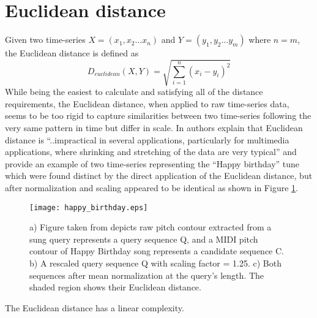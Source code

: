\section{Euclidean distance} \label{euclidean_distance}
Given two time-series $X=(x_{1},x_{2}...x_{n})$ and $Y=(y_{1},y_{2}...y_{m})$ where $n=m$, the Euclidean distance is defined as
\begin{equation}
 D_{euclidean}(X,Y) = \sqrt{ \sum_{i=1}^{n}  (x_{i} - y_{i})^2 }
 \label{eq:euclidean_distance}
\end{equation}
While being the easiest to calculate and satisfying all of the distance requirements, the Euclidean distance, when applied to raw time-series data, seems to be too rigid to capture similarities between two time-series following the very same pattern in time but differ in scale. In \cite{citeulike:4107287} authors explain that Euclidean distance is ``..impractical in several applications, particularly for multimedia applications, where shrinking and stretching of the data are very typical'' and provide an example of two time-series representing the ``Happy birthday'' tune which were found distinct by the direct application of the Euclidean distance, but after normalization and scaling appeared to be identical as shown in Figure \ref{fig:happybirthday}.
\begin{figure}[tbp]
   \centering
   \texttt{[image: happy\_birthday.eps]}
   \caption{a) Figure taken from \cite{citeulike:4107287} depicts raw pitch contour extracted from a sung query represents a query sequence Q, and a MIDI pitch contour of Happy Birthday song represents a candidate sequence C. b) A rescaled query sequence Q with scaling factor = 1.25. c) Both sequences after mean normalization at the query's length. The shaded region shows their Euclidean distance.}
   \label{fig:happybirthday}
\end{figure} 

The Euclidean distance has a linear complexity.

